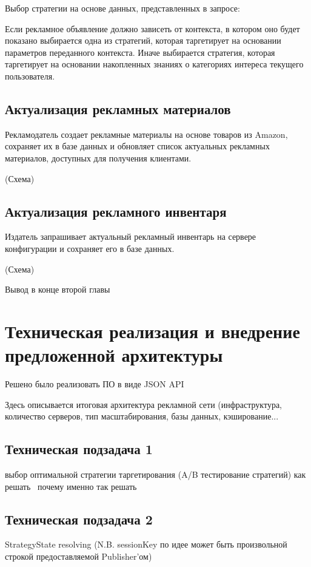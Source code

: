 \documentclass[times]{itmo-student-thesis}
\begin{document}
Выбор стратегии на основе данных, представленных в запросе:

Если рекламное объявление должно зависеть от контекста, в котором оно будет показано выбирается одна из стратегий, которая таргетирует на основании параметров переданного контекста. Иначе выбирается стратегия, которая таргетирует на основании накопленных знаниях о категориях интереса текущего пользователя.

\section{Актуализация рекламных материалов}

Рекламодатель создает рекламные материалы на основе товаров из Amazon, сохраняет их в базе данных и обновляет список актуальных рекламных материалов, доступных для получения клиентами.

(Схема)


\section{Актуализация рекламного инвентаря}

Издатель запрашивает актуальный рекламный инвентарь на сервере конфигурации и сохраняет его в базе данных.

(Схема)

\chapterconclusion

Вывод в конце второй главы

\chapter{Техническая реализация и внедрение предложенной архитектуры}

Решено было реализовать ПО в виде JSON API

Здесь описывается итоговая архитектура рекламной сети (инфраструктура, количество серверов, тип масштабирования, базы данных, кэширование...

\section{Техническая подзадача 1}
выбор оптимальной стратегии таргетирования (A/B тестирование стратегий)
как решать 
почему именно так решать

\section{Техническая подзадача 2}
StrategyState resolving (N.B. sessionKey по идее может быть произвольной строкой предоставляемой Publisher'ом)
\end{document}
